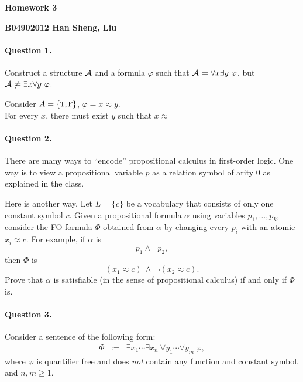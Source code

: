 \documentclass[11pt, a4paper]{article}
\renewcommand{\fulltitle}{Homework 3}
\begin{document}
\date{}




\begin{center}
{\Large {\bf \fulltitle}}
\end{center}
\hfill{\bf B04902012 Han Sheng, Liu}
\vspace{0.7cm}


\paragraph*{Question 1.}
Construct a structure $\mathcal{A}$ and a formula $\varphi$ such that
$\cA \models \forall x \exists y \ \varphi$,
but $\mathcal{A} \not\models \exists x \forall y \ \varphi$.
\begin{framed}
\solution
Consider $A=\{{\tt T}, {\tt F}\}$, $\varphi=x\approx y$. \\
For every $x$, there must exist $y$ such that $x \approx$
\end{framed}



\paragraph*{Question 2.}
There are many ways to ``encode''
propositional calculus in first-order logic.
One way is to view a propositional variable $p$ as
a relation symbol of arity $0$
as explained in the class.

Here is another way.
Let $L = \{c\}$ be a vocabulary that consists of only one
constant symbol $c$.
Given a propositional formula $\alpha$ 
using variables $p_1,\ldots,p_k$,
consider the FO formula $\Phi$
obtained from $\alpha$ by 
changing every $p_i$ with an atomic $x_i \approx c$.
For example, if $\alpha$ is 
$$p_1\wedge \neg p_2,$$
then $\Phi$ is 
$$
(x_1 \approx c) \ \wedge \ \neg (x_2 \approx c).
$$
Prove that
$\alpha$ is satisfiable (in the sense of propositional calculus)
if and only if $\Phi$ is.


\paragraph*{Question 3.}
Consider a sentence of the following form:
\begin{eqnarray*}
\Phi & := & \exists x_1 \cdots \exists x_n \ \forall y_1 \cdots \forall y_m \ \varphi,
\end{eqnarray*}
where $\varphi$ is quantifier free and does {\em not} contain any function and constant symbol, and $n,m \geq 1$.
\end{document}

